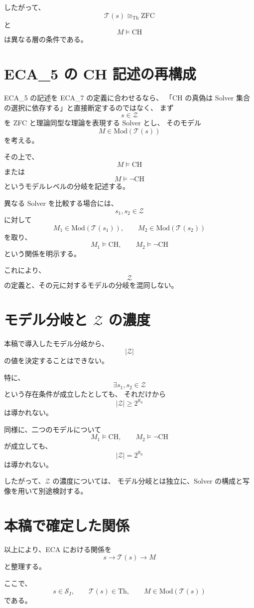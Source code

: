 \documentclass[a4paper,11pt]{jsarticle}
\newcommand{\Solver}{\mathcal{S}}
\newcommand{\Th}{\mathrm{Th}}
\newcommand{\Mod}{\mathrm{Mod}}
\begin{document}
したがって、
\[
\boxed{
\mathcal{T}(s)\cong_{\mathrm{Th}}\mathrm{ZFC}
}
\]
と
\[
\boxed{
M\models\mathrm{CH}
}
\]
は異なる層の条件である。

\section{ECA_5 の CH 記述の再構成}

ECA_5 の記述を ECA_7 の定義に合わせるなら、
「CH の真偽は Solver 集合の選択に依存する」と直接断定するのではなく、
まず
\[
s\in\mathcal{Z}
\]
を ZFC と理論同型な理論を表現する Solver とし、
そのモデル
\[
M\in\Mod(\mathcal{T}(s))
\]
を考える。

その上で、
\[
M\models\mathrm{CH}
\]
または
\[
M\models\neg\mathrm{CH}
\]
というモデルレベルの分岐を記述する。

異なる Solver を比較する場合には、
\[
s_1,s_2\in\mathcal{Z}
\]
に対して
\[
M_1\in\Mod(\mathcal{T}(s_1)),
\qquad
M_2\in\Mod(\mathcal{T}(s_2))
\]
を取り、
\[
M_1\models\mathrm{CH},
\qquad
M_2\models\neg\mathrm{CH}
\]
という関係を明示する。

これにより、
\[
\mathcal{Z}
\]
の定義と、その元に対するモデルの分岐を混同しない。

\section{モデル分岐と $\mathcal{Z}$ の濃度}

本稿で導入したモデル分岐から、
\[
|\mathcal{Z}|
\]
の値を決定することはできない。

特に、
\[
\exists s_1,s_2\in\mathcal{Z}
\]
という存在条件が成立したとしても、
それだけから
\[
|\mathcal{Z}|\geq2^{\aleph_0}
\]
は導かれない。

同様に、二つのモデルについて
\[
M_1\models\mathrm{CH},
\qquad
M_2\models\neg\mathrm{CH}
\]
が成立しても、
\[
|\mathcal{Z}|=2^{\aleph_0}
\]
は導かれない。

したがって、$\mathcal{Z}$ の濃度については、
モデル分岐とは独立に、Solver の構成と写像を用いて別途検討する。

\section{本稿で確定した関係}

以上により、ECA における関係を
\[
\boxed{
s
\longrightarrow
\mathcal{T}(s)
\longrightarrow
M
}
\]
と整理する。

ここで、
\[
s\in\Solver_I,\qquad
\mathcal{T}(s)\in\Th,\qquad
M\in\Mod(\mathcal{T}(s))
\]
である。
\end{document}
